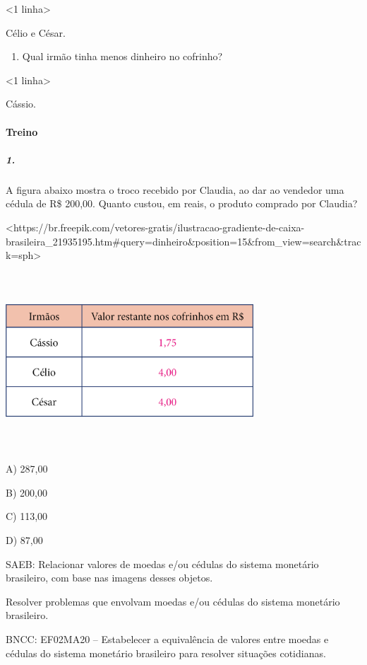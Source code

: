 \textless{}1 linha\textgreater{}

Célio e César.

\begin{enumerate}
\def\labelenumi{\alph{enumi})}
\item
  Qual irmão tinha menos dinheiro no cofrinho?
\end{enumerate}

\textless{}1 linha\textgreater{}

Cássio.

\paragraph{Treino}\label{treino-4}

\subparagraph{1.}\label{section-65}

A figura abaixo mostra o troco recebido por Claudia, ao dar ao vendedor
uma cédula de R\$ 200,00. Quanto custou, em reais, o produto comprado por Claudia?

\textless{}https://br.freepik.com/vetores-gratis/ilustracao-gradiente-de-caixa-brasileira\_21935195.htm\#query=dinheiro\&position=15\&from\_view=search\&track=sph\textgreater{}

\includegraphics[width=3.65497in,height=2.60417in]{media/image77.png}

A) 287,00

B) 200,00

C) 113,00

D) 87,00

SAEB: Relacionar valores de moedas e/ou cédulas do sistema
monetário brasileiro, com base nas imagens desses objetos.

Resolver problemas que envolvam moedas e/ou cédulas do sistema
monetário brasileiro.

BNCC: EF02MA20 -- Estabelecer a equivalência de valores entre moedas e cédulas do sistema monetário brasileiro para resolver situações cotidianas.

